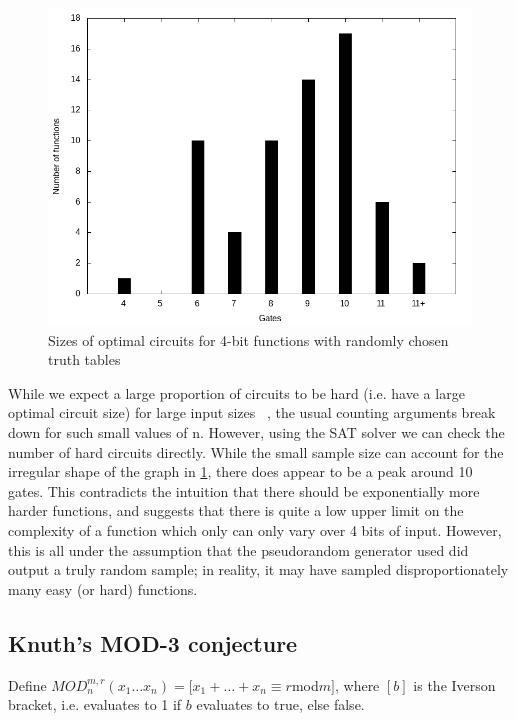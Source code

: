 \documentclass{article}
\begin{document}
\begin{figure}[!h]
  \includegraphics[width=\textwidth]{images/random/4bit_sizes.png}
  \caption{Sizes of optimal circuits for 4-bit functions with randomly chosen truth tables}
  \label{fig:4rand_sizes}
\end{figure}

While we expect a large proportion of circuits to be hard (i.e. have a large optimal circuit size) for large input sizes ~\cite{arora}, the usual counting arguments break down for such small values of n. However, using the SAT solver we can check the number of hard circuits directly. While the small sample size can account for the irregular shape of the graph in \ref{fig:4rand_sizes}, there does appear to be a peak around 10 gates. This contradicts the intuition that there should be exponentially more harder functions, and suggests that there is quite a low upper limit on the complexity of a function which only can only vary over 4 bits of input. However, this is all under the assumption that the pseudorandom generator used did output a truly random sample; in reality, it may have sampled disproportionately many easy (or hard) functions.



\subsection{Knuth's MOD-3 conjecture}

Define $MOD^{m,r}_n(x_1 \ldots x_n) = [x_1 + \ldots + x_n \equiv r $mod$ m]$, where $[b]$ is the Iverson bracket, i.e. evaluates to 1 if $b$ evaluates to true, else false.
\end{document}
